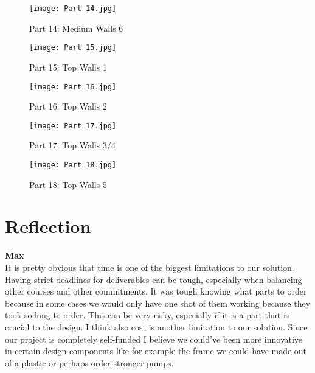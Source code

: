 \documentclass[12pt, titlepage]{article}
\begin{document}
\begin{figure}[H]
    \centerline{\texttt{[image: Part 14.jpg]}}
    \caption{Part 14: Medium Walls 6}
    \label{fig}
\end{figure}

\begin{figure}[H]
    \centerline{\texttt{[image: Part 15.jpg]}}
    \caption{Part 15: Top Walls 1}
    \label{fig}
\end{figure}

\begin{figure}[H]
    \centerline{\texttt{[image: Part 16.jpg]}}
    \caption{Part 16: Top Walls 2}
    \label{fig}
\end{figure}

\begin{figure}[H]
    \centerline{\texttt{[image: Part 17.jpg]}}
    \caption{Part 17: Top Walls 3/4}
    \label{fig}
\end{figure}

\begin{figure}[H]
    \centerline{\texttt{[image: Part 18.jpg]}}
    \caption{Part 18: Top Walls 5}
    \label{fig}
\end{figure}

\section{Reflection}



\textbf{Max}\\
It is pretty obvious that time is one of the biggest limitations to our solution. Having strict deadlines for deliverables can be tough, especially when balancing other courses and other commitments. It was tough knowing what parts to order because in some cases we would only have one shot of them working because they took so long to order. This can be very risky, especially if it is a part that is crucial to the design. I think also cost is another limitation to our solution. Since our project is completely self-funded I believe we could've been more innovative in certain design components like for example the frame we could have made out of a plastic or perhaps order stronger pumps. \\
\end{document}

